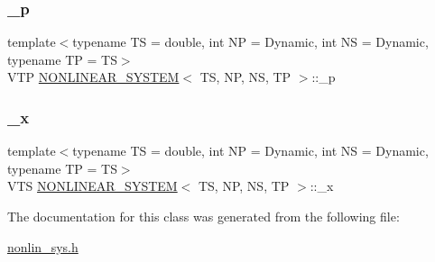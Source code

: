 \subsubsection{\texorpdfstring{\+\_\+p}{\_p}}
{\footnotesize\ttfamily template$<$typename TS = double, int NP = Dynamic, int NS = Dynamic, typename TP = TS$>$ \\
V\+TP \mbox{\hyperlink{class_n_o_n_l_i_n_e_a_r___s_y_s_t_e_m}{N\+O\+N\+L\+I\+N\+E\+A\+R\+\_\+\+S\+Y\+S\+T\+EM}}$<$ TS, NP, NS, TP $>$\+::\+\_\+p\hspace{0.3cm}{\ttfamily [protected]}}

\mbox{\label{class_n_o_n_l_i_n_e_a_r___s_y_s_t_e_m_a06e2289a0e10aa47527d5fd348faf4f9}} 
\subsubsection{\texorpdfstring{\+\_\+x}{\_x}}
{\footnotesize\ttfamily template$<$typename TS = double, int NP = Dynamic, int NS = Dynamic, typename TP = TS$>$ \\
V\+TS \mbox{\hyperlink{class_n_o_n_l_i_n_e_a_r___s_y_s_t_e_m}{N\+O\+N\+L\+I\+N\+E\+A\+R\+\_\+\+S\+Y\+S\+T\+EM}}$<$ TS, NP, NS, TP $>$\+::\+\_\+x\hspace{0.3cm}{\ttfamily [protected]}}



The documentation for this class was generated from the following file\+:\begin{DoxyCompactItemize}
\item 
\mbox{\hyperlink{nonlin__sys_8h}{nonlin\+\_\+sys.\+h}}\end{DoxyCompactItemize}
